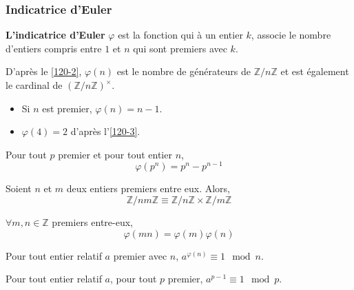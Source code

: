 	\subsubsection{Indicatrice d'Euler}
		
	
	\begin{definition}
		\textbf{L'indicatrice d'Euler} $\varphi$ est la fonction qui à un entier $k$, associe le nombre d'entiers compris entre $1$ et $n$ qui sont premiers avec $k$.
	\end{definition}
	
	\begin{remark}
		D'après le \cref{120-2}, $\varphi(n)$ est le nombre de générateurs de $\mathbb{Z}/n\mathbb{Z}$ et est également le cardinal de $(\mathbb{Z}/n\mathbb{Z})^\times$.
	\end{remark}
	
	\begin{example}
		\begin{itemize}
			\item Si $n$ est premier, $\varphi(n) = n-1$.
			\item $\varphi(4) = 2$ d'après l'\cref{120-3}.
		\end{itemize}
	\end{example}
	
	
	\begin{proposition}
		Pour tout $p$ premier et pour tout entier $n$,
		\[ \varphi(p^n) = p^n - p^{n-1} \]
	\end{proposition}
	
	\begin{theorem}[Chinois]
		\label{120-4}
		Soient $n$ et $m$ deux entiers premiers entre eux. Alors,
		\[ \mathbb{Z}/nm\mathbb{Z} \equiv \mathbb{Z}/n\mathbb{Z} \times \mathbb{Z}/m\mathbb{Z} \]
	\end{theorem}
	
	\begin{corollary}
		$\forall m, n \in \mathbb{Z}$ premiers entre-eux,
		\[ \varphi(mn) = \varphi(m)\varphi(n) \]
	\end{corollary}
	
	\begin{proposition}
		Pour tout entier relatif $a$ premier avec $n$, $a^{\varphi(n)} \equiv 1 \mod n$.
	\end{proposition}
	
	\begin{proposition}
		Pour tout entier relatif $a$, pour tout $p$ premier, $a^{p-1} \equiv 1 \mod p$.
	\end{proposition}
	
